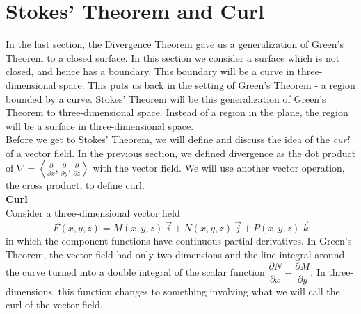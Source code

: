 \section{Stokes' Theorem and Curl}\label{sec:stokes_theorem}

In the last section, the Divergence Theorem gave us a generalization of Green's Theorem to a closed surface. In this section we consider a surface which is not closed, and hence has a boundary.  This boundary will be a curve in three-dimensional space. This puts us back in the setting of Green's Theorem - a region bounded by a curve. Stokes' Theorem will be this generalization of Green's Theorem to three-dimensional space. Instead of a region in the plane, the region will be a surface in three-dimensional space.\\

Before we get to Stokes' Theorem, we will define and discuss the idea of the \emph{curl} of a vector field. In the previous section, we defined divergence as the dot product of $\nabla = \left\langle \frac{\partial}{\partial x}, \frac{\partial}{\partial y}, \frac{\partial}{\partial z} \right\rangle$ with the vector field.  We will use another vector operation, the cross product, to define curl.\\

\noindent\textbf{\large Curl}\\

Consider a three-dimensional vector field $$\vec F(x,y,z) = M(x,y,z) \: \vec i + N(x,y,z) \: \vec j + P(x,y,z) \: \vec k$$ in which the component functions have continuous partial derivatives. In Green's Theorem, the vector field had only two dimensions and the line integral around the curve turned into a double integral of the scalar function $\dfrac{\partial N}{\partial x} - \dfrac{\partial M}{\partial y}$.  In three-dimensions, this function changes to something involving what we will call the curl of the vector field.\\

